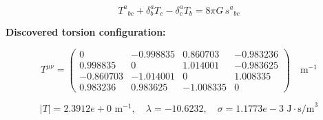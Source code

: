 
\begin{equation}
  T^a{}_{bc} + \delta^a_b T_c - \delta^a_c T_b = 8\pi G \, s^a{}_{bc}
\end{equation}

\textbf{Discovered torsion configuration:}

\begin{equation}
  T^{\mu\nu} = \begin{pmatrix}
    0 & -0.998835 & 0.860703 & -0.983236 \\
    0.998835 & 0 & 1.014001 & -0.983625 \\
    -0.860703 & -1.014001 & 0 & 1.008335 \\
    0.983236 & 0.983625 & -1.008335 & 0
  \end{pmatrix} \quad \text{m}^{-1}
\end{equation}

\begin{equation}
  |T| = 2.3912e+0 \text{ m}^{-1}, \quad
  \lambda = -10.6232, \quad
  \sigma = 1.1773e-3 \text{ J}\cdot\text{s/m}^3
\end{equation}